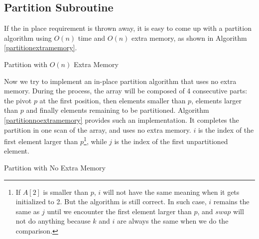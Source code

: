 \subsection{Partition Subroutine}
If the in place requirement is thrown away, it is easy to come up with a partition algorithm using $O(n)$ time and $O(n)$ extra memory, as shown in Algorithm \ref{partitionextramemory}.
\begin{algorithm}[ht]
\caption{Partition with $O(n)$ Extra Memory}\label{partitionextramemory}
\begin{algorithmic}[1]
\Input{}
\Output{}
\Else{}
\EndIf
\EndFor
{}
\end{algorithmic}
\end{algorithm}

Now we try to implement an in-place partition algorithm that uses no extra memory. During the process, the array will be composed of 4 consecutive parts: the pivot $p$ at the first position, then elements smaller than $p$, elements larger than $p$ and finally elements remaining to be partitioned. Algorithm \ref{partitionnoextramemory} provides such an implementation. It completes the partition in one scan of the array, and uses no extra memory. $i$ is the index of the first element larger than $p$\footnote{If $A[2]$ is smaller than $p$, $i$ will not have the same meaning when it gets initialized to 2. But the algorithm is still correct. In such case, $i$ remains the same as $j$ until we encounter the first element larger than $p$, and $swap$ will not do anything because $k$ and $i$ are always the same when we do the comparison.}, while $j$ is the index of the first unpartitioned element. 
\begin{algorithm}[ht]
\caption{Partition with No Extra Memory}\label{partitionnoextramemory}
\begin{algorithmic}[1]
\Input{}
\Output{}
\EndIf
{}
\EndFor
{}
\end{algorithmic}
\end{algorithm}
